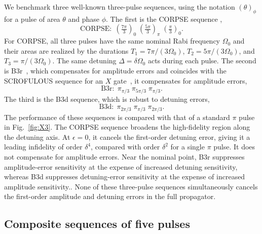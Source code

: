 \documentclass[10pt,aps,twocolumn,pra,floatfix,superscriptaddress]{revtex4-2}
\begin{document}
We benchmark three well-known three-pulse sequences, using the notation $(\theta)_\phi$ for a pulse of area $\theta$ and phase $\phi$. The first is the CORPSE sequence \cite{TYCKO198590,Cummins_2003},
\begin{equation}
\mathrm{CORPSE}:\; \left(\tfrac{7\pi}{3}\right)_0\; \left(\tfrac{5\pi}{3}\right)_\pi\; \left(\tfrac{\pi}{3}\right)_0 .
\end{equation}
For CORPSE, all three pulses have the same nominal Rabi frequency $\Omega_0$ and their areas are realized by the durations $T_1=7\pi/(3\Omega_0)$, $T_2=5\pi/(3\Omega_0)$, and $T_3=\pi/(3\Omega_0)$. The same detuning $\Delta=\delta\Omega_0$ acts during each pulse.
The second is B3r~\cite{LEVITT198661}, which compensates for amplitude errors and coincides with the SCROFULOUS sequence for an $X$ gate~\cite{Cummins_2003}, it compensates for amplitude errors, 
\begin{equation}
\mathrm{B3r}:\; \pi_{\pi/3}\; \pi_{5\pi/3}\; \pi_{\pi/3}.
\end{equation}
The third is the B3d sequence, which is robust to detuning errors,
\begin{equation}
\mathrm{B3d}:\; \pi_{2\pi/3}\; \pi_{\pi/3}\; \pi_{2\pi/3}.
\end{equation}
The performance of these sequences is compared with that of a standard $\pi$ pulse in Fig.~\ref{fig:X3}.
The CORPSE sequence broadens the high-fidelity region along the detuning axis. At $\epsilon=0$, it cancels the first-order detuning error, giving it a leading infidelity of order $\delta^4$, compared with order $\delta^2$ for a single $\pi$ pulse. It does not compensate for amplitude errors.
Near the nominal point, B3r suppresses amplitude-error sensitivity at the expense of increased detuning sensitivity, whereas B3d suppresses detuning-error sensitivity at the expense of increased amplitude sensitivity..
None of these three-pulse sequences simultaneously cancels the first-order amplitude and detuning errors in the full propagator.

\subsection{Composite sequences of five pulses}
\end{document}
